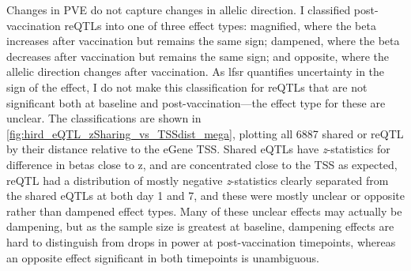Changes in \gls{PVE} do not capture changes in allelic direction.
I classified post-vaccination \glspl{reQTL} into one of three effect types:
magnified, where the beta increases after vaccination but remains the same sign;
dampened, where the beta decreases after vaccination but remains the same sign;
and opposite, where the allelic direction changes after vaccination.
As \gls{lfsr} quantifies uncertainty in the sign of the effect, I do not make this classification for \glspl{reQTL} that are not significant both at baseline and post-vaccination---the effect type for these are unclear.
The classifications are shown in \cref{fig:hird_eQTL_zSharing_vs_TSSdist_mega}, plotting all 6887 shared or \gls{reQTL} by their distance relative to the eGene \gls{TSS}.
Shared \glspl{eQTL} have \textit{z}-statistics for difference in betas close to z, and are concentrated close to the \gls{TSS} as expected, 
\gls{reQTL} had a distribution of mostly negative \textit{z}-statistics clearly separated from the shared \glspl{eQTL} at both day 1 and 7,
and these were mostly unclear or opposite rather than dampened effect types.
Many of these unclear effects may actually be dampening, 
but as the sample size is greatest at baseline, 
dampening effects are hard to distinguish from drops in power at post-vaccination timepoints, 
whereas an opposite effect significant in both timepoints is unambiguous.

